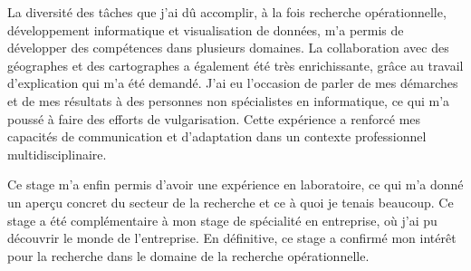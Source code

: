 La diversité des tâches que j'ai dû accomplir, à la fois recherche opérationnelle, développement informatique et visualisation de données, m'a permis de développer des compétences dans plusieurs domaines. La collaboration avec des géographes et des cartographes a également été très enrichissante, grâce au travail d'explication qui m'a été demandé. J'ai eu l'occasion de parler de mes démarches et de mes résultats à des personnes non spécialistes en informatique, ce qui m'a poussé à faire des efforts de vulgarisation. Cette expérience a renforcé mes capacités de communication et d'adaptation dans un contexte professionnel multidisciplinaire.

Ce stage m'a enfin permis d'avoir une expérience en laboratoire, ce qui m'a donné un aperçu concret du secteur de la recherche et ce à quoi je tenais beaucoup. Ce stage a été complémentaire à mon stage de spécialité en entreprise, où j'ai pu découvrir le monde de l'entreprise. En définitive, ce stage a confirmé mon intérêt pour la recherche dans le domaine de la recherche opérationnelle.